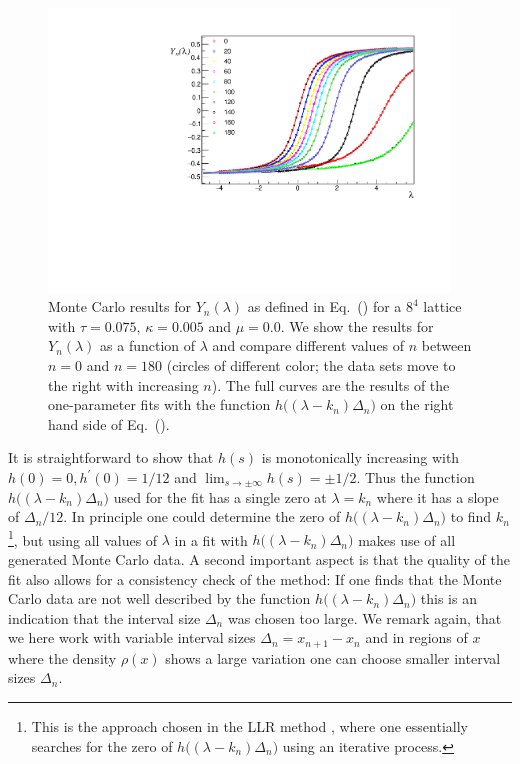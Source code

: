 \documentclass[a4paper,11pt]{article}
\begin{document}
\begin{figure}[t]
\begin{center}
\includegraphics[width=0.95\textwidth]{Fit_example_new.pdf}
\end{center}
\caption{Monte Carlo results for $Y_{n}(\lambda)$ as defined in Eq.~(\protect{\ref{eq:sigmoid-function}}) for a 
$8^4$ lattice with $\tau=0.075$, $\kappa = 0.005$ and $\mu=0.0$. We show the  results for $Y_{n}(\lambda)$ as a 
function of $\lambda$ and compare different values of $n$ between $n = 0$ and $n = 180$ (circles of different color;  
the data sets move to the right with increasing $n$). The full curves are the results of the one-parameter 
fits with the function $h\Big(\!(\lambda-k_n)\Delta_n \!\Big)$ on the right hand side of 
Eq.~(\protect{\ref{eq:sigmoid-function}}).
\label{fig:fit-example}}
\end{figure}


It is straightforward to show that $h(s)$ is monotonically increasing with $h(0) = 0, h^\prime(0) = 1/12$ and 
$\lim_{s \rightarrow \pm \infty} h(s) = \pm 1/2$. Thus the function $h\Big(\!(\lambda-k_n)\Delta_n \!\Big)$ used for the fit
has a single zero at $\lambda = k_n$ where it has a slope of $\Delta_n/12$. In principle one could determine
the zero of $h\Big(\!(\lambda-k_n)\Delta_n \!\Big)$ to find $k_n$\footnote{This is the approach chosen in the LLR 
method \cite{Langfeld:2012ah,Langfeld:2013xbf,Langfeld:2014nta,Langfeld:2015fua,Garron:2016noc}, where 
one essentially searches for the zero of $h\Big(\!(\lambda-k_n)\Delta_n \!\Big)$ using an iterative
process.}, but using all values of $\lambda$ in a fit with 
$h\Big(\!(\lambda-k_n)\Delta_n \!\Big)$ makes use of all generated Monte Carlo data. 
A second important aspect is that the quality of the fit also allows for a consistency check of the method: If one finds
that the Monte Carlo data are not well described by the function $h\Big(\!(\lambda-k_n)\Delta_n \!\Big)$ this is an
indication that the interval size $\Delta_n$ was chosen too large. We remark again, that we here work 
with variable interval sizes $\Delta_n = x_{n+1} - x_n$ and in regions of $x$ where the density $\rho(x)$ 
shows a large variation one can choose smaller interval sizes $\Delta_n$.
\end{document}
